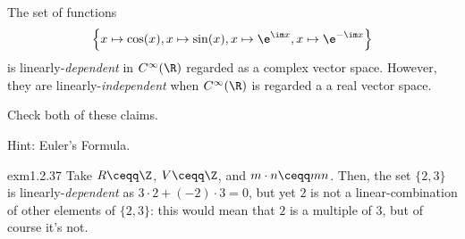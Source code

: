 \begin{exm}{}{}
	The set of functions
	\begin{equation}
		\left\{ x\mapsto \cos (x),x\mapsto \sin (x),x\mapsto \e ^{\im x},x\mapsto \e ^{-\im x}\right\} 
	\end{equation}
	is linearly-\emph{dependent} in $C^{\infty}(\R )$ regarded as a complex vector space.  However, they are linearly-\emph{independent} when $C^{\infty}(\R )$ is regarded a a real vector space.
	\begin{exr}[breakable=false]{}{}
		Check both of these claims.
		\begin{rmk}
			Hint:  Euler's Formula.
		\end{rmk}
	\end{exr}
\end{exm}
\begin{exm}{}{exm1.2.37}
	Take $R\ceqq \Z$, $V\ceqq \Z$, and $m\cdot n\ceqq mn$.  Then, the set $\{ 2,3\}$ is linearly-\emph{dependent} as $3\cdot 2+(-2)\cdot 3=0$, but yet $2$ is not a linear-combination of other elements of $\{ 2,3\}$:  this would mean that $2$ is a multiple of $3$, but of course it's not.
\end{exm}
